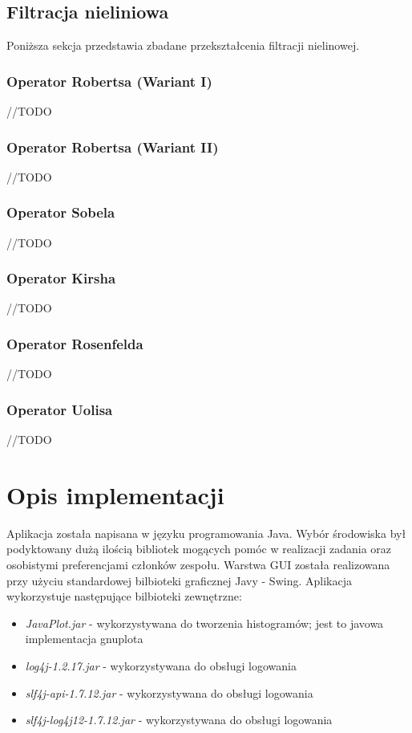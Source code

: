 \documentclass{classrep}
\begin{document}
\subsection{Filtracja nieliniowa}
Poniższa sekcja przedstawia zbadane przekształcenia filtracji nielinowej.

\subsubsection{Operator Robertsa (Wariant I)}
//TODO

\subsubsection{Operator Robertsa (Wariant II)}
//TODO

\subsubsection{Operator Sobela}
//TODO

\subsubsection{Operator Kirsha}
//TODO

\subsubsection{Operator Rosenfelda}
//TODO

\subsubsection{Operator Uolisa}
//TODO

\section{Opis implementacji}
Aplikacja została napisana w języku programowania Java. Wybór środowiska był podyktowany dużą ilością bibliotek mogących pomóc w realizacji zadania oraz osobistymi preferencjami członków zespołu. Warstwa GUI została realizowana przy użyciu standardowej bilbioteki graficznej Javy - Swing. Aplikacja wykorzystuje następujące bilbioteki zewnętrzne:
\begin{itemize}
\item \textit{JavaPlot.jar} - wykorzystywana do tworzenia histogramów; jest to javowa implementacja gnuplota 
\item \textit{log4j-1.2.17.jar} - wykorzystywana do obsługi logowania
\item \textit{slf4j-api-1.7.12.jar} - wykorzystywana do obsługi logowania
\item \textit{slf4j-log4j12-1.7.12.jar} - wykorzystywana do obsługi logowania
\end{itemize}
\end{document}
